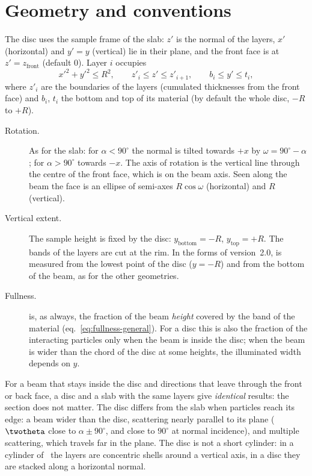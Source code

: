 \section{Geometry and conventions}

The disc uses the sample frame of the slab: $z'$ is the normal of the layers, $x'$ (horizontal) and $y'=y$ (vertical) lie in their
plane, and the front face is at $z'=z_\mathrm{front}$ (default 0). Layer $i$ occupies
\begin{equation}
  x'^2 + y'^2 \le R^2, \qquad z'_i \le z' \le z'_{i+1}, \qquad b_i \le y' \le t_i,
  \label{eq:disc-layer}
\end{equation}
where $z'_i$ are the boundaries of the layers (cumulated thicknesses from the front face) and $b_i$, $t_i$ the bottom and top of
its material (by default the whole disc, $-R$ to $+R$).

\begin{description}
  \item[Rotation.] As for the slab: for $\alpha<90^\circ$ the normal is tilted towards $+x$ by $\omega=90^\circ-\alpha$; for
        $\alpha>90^\circ$ towards $-x$. The axis of rotation is the vertical line through the centre of the front face, which is on the
        beam axis. Seen along the beam the face is an ellipse of semi-axes $R\cos\omega$ (horizontal) and $R$ (vertical).
  \item[Vertical extent.] The sample height is fixed by the disc: $y_\mathrm{bottom}=-R$, $y_\mathrm{top}=+R$. The bands of the layers
        are cut at the rim. In the forms of version~2.0,  is measured from the lowest point of the disc ($y=-R$) and
         from the bottom of the beam, as for the other geometries.
  \item[Fullness.]  is, as always, the fraction of the beam \emph{height} covered by the band of the material
        (eq.~\ref{eq:fullness-general}). For a disc this is also the fraction of the interacting particles only when the beam is
        inside the disc; when the beam is wider than the chord of the disc at some heights, the illuminated width depends on $y$.
\end{description}

\begin{note}
For a beam that stays inside the disc and directions that leave through the front or back face, a disc and a slab with the
same layers give \emph{identical} results: the section does not matter. The disc differs from the slab when particles reach its
edge: a beam wider than the disc, scattering nearly parallel to its plane ($\twotheta$ close to $\alpha \pm 90^\circ$, and close to
$90^\circ$ at normal incidence), and multiple scattering, which travels far in the plane. The disc is not a short cylinder: in a
cylinder of \mcams\ the layers are concentric shells around a vertical axis, in a disc they are stacked along a horizontal normal.
\end{note}

